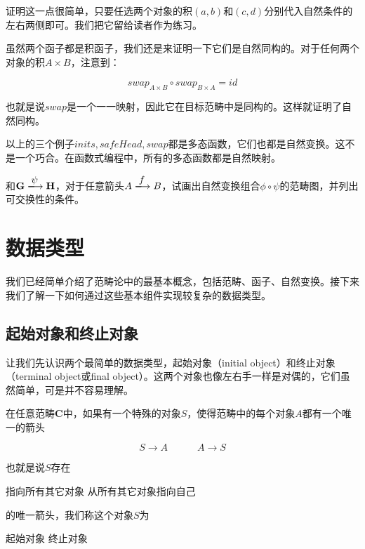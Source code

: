 \documentclass{article}
\begin{document}
证明这一点很简单，只要任选两个对象的积$(a, b)$和$(c, d)$分别代入自然条件的左右两侧即可。我们把它留给读者作为练习。

虽然两个函子都是积函子，我们还是来证明一下它们是自然同构的。对于任何两个对象的积$A \times B$，注意到：

\[
swap_{A \times B} \circ swap_{B \times A} = id
\]

也就是说$swap$是一个一一映射，因此它在目标范畴中是同构的。这样就证明了自然同构。

以上的三个例子$inits, safeHead, swap$都是多态函数，它们也都是自然变换。这不是一个巧合。在函数式编程中，所有的多态函数都是自然映射\cite{Wadler-1989}。

\begin{Exercise}
和$\mathbf{G} \arrowto{\psi} \mathbf{H}$，对于任意箭头$A \arrowto{f} B$，试画出自然变换组合$\phi \circ \psi$的范畴图，并列出可交换性的条件。
\end{Exercise}

\section{数据类型}

我们已经简单介绍了范畴论中的最基本概念，包括范畴、函子、自然变换。接下来我们了解一下如何通过这些基本组件实现较复杂的数据类型。

\subsection{起始对象和终止对象}
让我们先认识两个最简单的数据类型，起始对象（initial object）和终止对象（terminal object或final object）。这两个对象也像左右手一样是对偶的，它们虽然简单，可是并不容易理解。

 
\begin{definition}
在任意范畴$\pmb{C}$中，如果有一个特殊的对象$S$，使得范畴中的每个对象$A$都有一个唯一的箭头

\[
  S \longrightarrow A \quad \quad \quad A \longrightarrow S
\]

也就是说$S$存在

\begin{center}
  指向所有其它对象  \quad \quad \quad 从所有其它对象指向自己
\end{center}
的唯一箭头，我们称这个对象$S$为

\begin{center}
  起始对象 \quad \quad \quad 终止对象
\end{center}
\end{definition}
\end{document}
